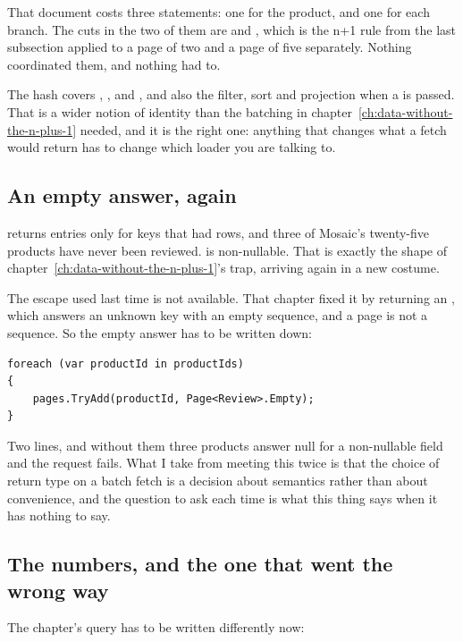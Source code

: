 That document costs three statements: one for the product, and one for each
branch. The cuts in the two of them are  and ,
which is the n+1 rule from the last subsection applied to a page of two and a
page of five separately. Nothing coordinated them, and nothing had to.

The hash covers , ,  and , and
also the filter, sort and projection when a  is passed. That
is a wider notion of identity than the batching in
chapter~\ref{ch:data-without-the-n-plus-1} needed, and it is the right one:
anything that changes what a fetch would return has to change which loader you
are talking to.

\subsection*{An empty answer, again}

%
 returns entries only for keys that had rows, and three
of Mosaic's twenty-five products have never been reviewed.  is
non-nullable. That is exactly the shape of
chapter~\ref{ch:data-without-the-n-plus-1}'s trap, arriving again in a new
costume.

The escape used last time is not available. That chapter fixed it by returning
an , which answers an unknown key with an empty sequence, and a
page is not a sequence. So the empty answer has to be written down:

\begin{verbatim}
foreach (var productId in productIds)
{
    pages.TryAdd(productId, Page<Review>.Empty);
}
\end{verbatim}

Two lines, and without them three products answer null for a non-nullable field
and the request fails. What I take from meeting this twice is that the choice of
return type on a batch fetch is a decision about semantics rather than about
convenience, and the question to ask each time is what this thing says when it
has nothing to say.

\subsection*{The numbers, and the one that went the wrong way}

%
The chapter's query has to be written differently now:

